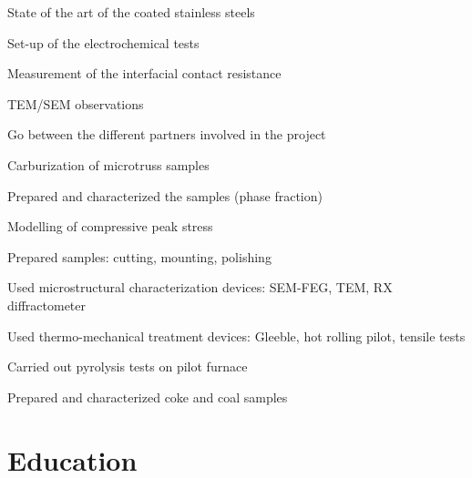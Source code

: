 \documentclass[11pt, a4paper, notitlepage]{article}
\begin{document}
		\begin{jobdetails}
			\item State of the art of the coated stainless steels
			\item Set-up of the electrochemical tests
			\item Measurement of the interfacial contact resistance
			\item TEM/SEM observations
			\item Go between the different partners involved in the project
		\end{jobdetails}

		\begin{jobdetails}
			\item Carburization of microtruss samples
			\item Prepared and characterized the samples (phase fraction)
			\item Modelling of compressive peak stress
		\end{jobdetails}
		
		\begin{jobdetails}
			\item Prepared samples: cutting, mounting, polishing
			\item Used microstructural characterization devices: SEM-FEG, TEM, RX diffractometer
			\item Used thermo-mechanical treatment devices: Gleeble, hot rolling pilot, tensile tests
		\end{jobdetails}

		\begin{jobdetails}
			\item Carried out pyrolysis tests on pilot furnace
			\item Prepared and characterized coke and coal samples
		\end{jobdetails}

	\newpage

    \section*{Education}
\end{document}
